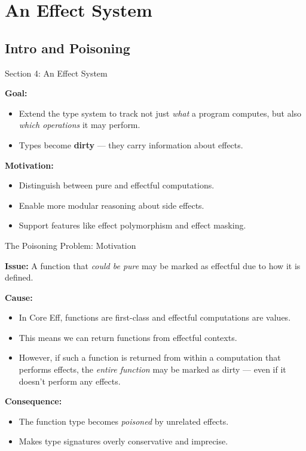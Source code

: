 \section{An Effect System}
\subsection{Intro and Poisoning}

\begin{frame}{Section 4: An Effect System}

\textbf{Goal:}
\begin{itemize}
  \item Extend the type system to track not just \emph{what} a program computes,
  but also \emph{which operations} it may perform.
  \item Types become \textbf{dirty} — they carry information about effects.
\end{itemize}

\vspace{1em}
\textbf{Motivation:}
\begin{itemize}
  \item Distinguish between pure and effectful computations.
  \item Enable more modular reasoning about side effects.
  \item Support features like effect polymorphism and effect masking.
\end{itemize}

\end{frame}

\begin{frame}{The Poisoning Problem: Motivation}

\textbf{Issue:} A function that \emph{could be pure} may be marked as effectful due to how it is defined.

\vspace{1em}
\textbf{Cause:}
\begin{itemize}
  \item In Core Eff, functions are first-class and effectful computations are values.
  \item This means we can return functions from effectful contexts.
  \item However, if such a function is returned from within a computation that performs effects, the \emph{entire function} may be marked as dirty — even if it doesn’t perform any effects.
\end{itemize}

\vspace{1em}
\textbf{Consequence:}
\begin{itemize}
  \item The function type becomes \emph{poisoned} by unrelated effects.
  \item Makes type signatures overly conservative and imprecise.
\end{itemize}

\end{frame}

